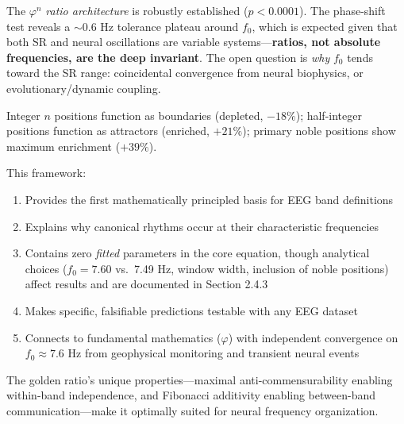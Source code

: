 \documentclass[11pt,a4paper]{article}
\newcommand{\phisym}{\varphi}
\newcommand{\fzero}{f_0}
\begin{document}
\noindent The $\phisym^n$ \textit{ratio architecture} is robustly established ($p < 0.0001$). The phase-shift test reveals a $\sim$0.6 Hz tolerance plateau around $\fzero$, which is expected given that both SR and neural oscillations are variable systems---\textbf{ratios, not absolute frequencies, are the deep invariant}. The open question is \textit{why} $\fzero$ tends toward the SR range: coincidental convergence from neural biophysics, or evolutionary/dynamic coupling.

\noindent Integer $n$ positions function as boundaries (depleted, $-18\%$); half-integer positions function as attractors (enriched, $+21\%$); primary noble positions show maximum enrichment ($+39\%$).

This framework:

\begin{enumerate}
    \item Provides the first mathematically principled basis for EEG band definitions
    \item Explains why canonical rhythms occur at their characteristic frequencies
    \item Contains zero \textit{fitted} parameters in the core equation, though analytical choices ($\fzero = 7.60$ vs.\ 7.49 Hz, window width, inclusion of noble positions) affect results and are documented in Section 2.4.3
    \item Makes specific, falsifiable predictions testable with any EEG dataset
    \item Connects to fundamental mathematics ($\phisym$) with independent convergence on $\fzero \approx 7.6$ Hz from geophysical monitoring and transient neural events
\end{enumerate}

The golden ratio's unique properties---maximal anti-commensurability enabling within-band independence, and Fibonacci additivity enabling between-band communication---make it optimally suited for neural frequency organization.



\newpage

\end{document}
